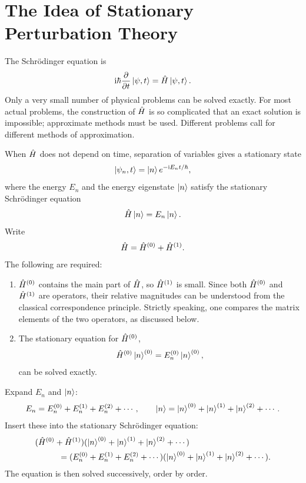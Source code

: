 \section{The Idea of Stationary Perturbation Theory}
The Schr\"odinger equation is
\begin{equation}
 \mathrm{i}\hbar\frac{\partial}{\partial t}\left|\psi,t\right\rangle
 =\hat{H}\left|\psi,t\right\rangle.
\end{equation}
Only a very small number of physical problems can be solved exactly. For most actual problems, the construction of $\hat{H}$ is so complicated that an exact solution is impossible; approximate methods must be used. Different problems call for different methods of approximation.

When $\hat{H}$ does not depend on time, separation of variables gives a stationary state
\begin{equation}
 \left|\psi_n,t\right\rangle=\left|n\right\rangle e^{-\mathrm{i} E_nt/\hbar},
\end{equation}
where the energy $E_n$ and the energy eigenstate $\left|n\right\rangle$ satisfy the stationary Schr\"odinger equation
\begin{equation}
 \hat{H}\left|n\right\rangle=E_n\left|n\right\rangle.
\end{equation}
Write
\begin{equation}
 \hat{H}=\hat{H}^{(0)}+\hat{H}^{(1)}.
\end{equation}
The following are required:
\begin{enumerate}
\item $\hat{H}^{(0)}$ contains the main part of $\hat{H}$, so $\hat{H}^{(1)}$ is small. Since both $\hat{H}^{(0)}$ and $\hat{H}^{(1)}$ are operators, their relative magnitudes can be understood from the classical correspondence principle. Strictly speaking, one compares the matrix elements of the two operators, as discussed below.
\item The stationary equation for $\hat{H}^{(0)}$,
\begin{equation}
 \hat{H}^{(0)}\left|n\right\rangle^{(0)}=E_n^{(0)}\left|n\right\rangle^{(0)},
\end{equation}
can be solved exactly.
\end{enumerate}
Expand $E_n$ and $\left|n\right\rangle$:
\begin{equation}
 E_n=E_n^{(0)}+E_n^{(1)}+E_n^{(2)}+\cdots,
 \qquad
 \left|n\right\rangle=\left|n\right\rangle^{(0)}+\left|n\right\rangle^{(1)}+\left|n\right\rangle^{(2)}+\cdots.
\end{equation}
Insert these into the stationary Schr\"odinger equation:
\begin{equation}\begin{aligned}
 &(\op H^{(0)}+\op H^{(1)})
 (\ket n^{(0)}+\ket n^{(1)}+\ket n^{(2)}+\cdots)\\
 &\hspace{10mm}=(E_n^{(0)}+E_n^{(1)}+E_n^{(2)}+\cdots)
 (\ket n^{(0)}+\ket n^{(1)}+\ket n^{(2)}+\cdots).
\end{aligned}\end{equation}
The equation is then solved successively, order by order.


